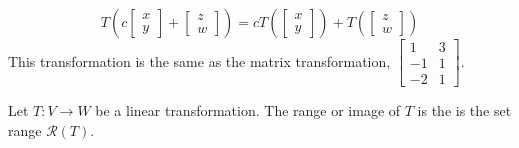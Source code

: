 \begin{ex}
\[T(c\begin{bmatrix}x\\y\end{bmatrix}+\begin{bmatrix}z\\w\end{bmatrix})=cT(\begin{bmatrix}x\\y\end{bmatrix})+T(\begin{bmatrix}z\\w\end{bmatrix})\]
This transformation is the same as the matrix transformation, $\begin{bmatrix}1 & 3\\ -1 & 1\\ -2 & 1\end{bmatrix}$.
\end{ex}

\begin{defn}
Let $T: V\to W$ be a linear transformation. The range or image of $T$ is the is the set range $\mathscr{R}(T)$.

\end{defn}

